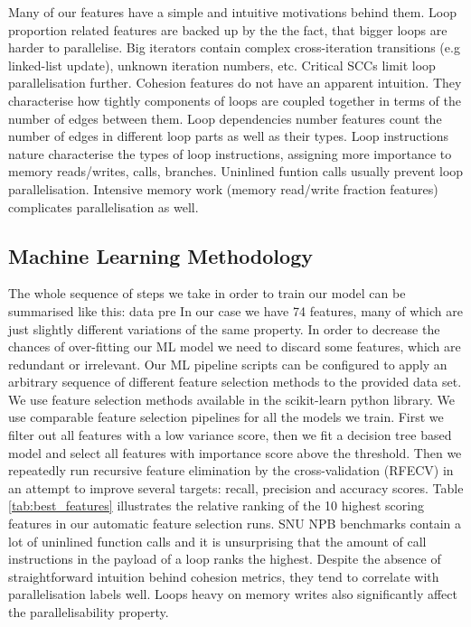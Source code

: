 \documentclass{acaces}
\begin{document}
\quad Many of our features have a simple and intuitive motivations behind them. Loop proportion related features are backed up by the the fact, that bigger loops are harder to parallelise. Big iterators contain complex cross-iteration transitions (e.g linked-list update), unknown iteration numbers, etc. Critical SCCs limit loop parallelisation further. Cohesion features do not have an apparent intuition. They characterise how tightly components of loops are coupled together in terms of the number of edges between them. Loop dependencies number features count the number of edges in different loop parts as well as their types. Loop instructions nature characterise the types of loop instructions, assigning more importance to memory reads/writes, calls, branches. Uninlined funtion calls usually prevent loop parallelisation. Intensive memory work (memory read/write fraction features) complicates parallelisation as well.

\subsection{Machine Learning Methodology}

\quad The whole sequence of steps we take in order to train our model can be summarised like this: data pre  
\quad In our case we have 74 features, many of which are just slightly different variations of the same property. In order to decrease the chances of over-fitting our ML model we need to discard some features, which are redundant or irrelevant.\newline\null
\quad Our ML pipeline scripts can be configured to apply an arbitrary sequence of different feature selection methods to the provided data set. We use feature selection methods available in the scikit-learn python library. We use comparable feature selection pipelines for all the models we train. First we filter out all features with a low variance score, then we fit a decision tree based model and select all features with importance score above the threshold. Then we repeatedly run recursive feature elimination by the cross-validation (RFECV) in an attempt to improve several targets: recall, precision and accuracy scores. Table \ref{tab:best_features} illustrates the relative ranking of the 10 highest scoring features in our automatic feature selection runs.\newline\null  
\quad SNU NPB benchmarks contain a lot of uninlined function calls and it is unsurprising that the amount of call instructions in the payload of a loop ranks the highest. Despite the absence of straightforward intuition behind cohesion metrics, they tend to correlate with parallelisation labels well. Loops heavy on memory writes also significantly affect the parallelisability property.
\end{document}
